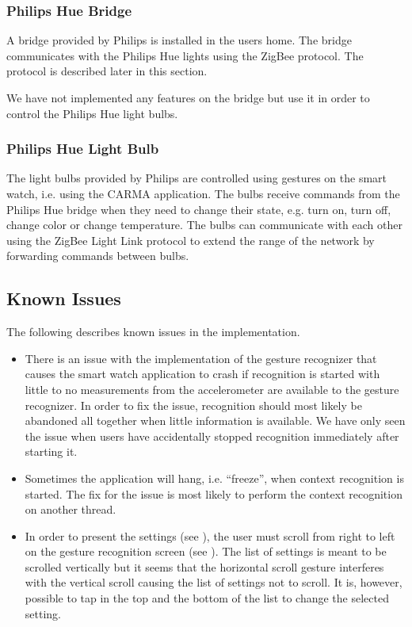 \subsubsection{Philips Hue Bridge}

A bridge provided by Philips is installed in the users home. The bridge communicates with the Philips Hue lights using the ZigBee protocol. The protocol is described later in this section.

We have not implemented any features on the bridge but use it in order to control the Philips Hue light bulbs.

\subsubsection{Philips Hue Light Bulb}

The light bulbs provided by Philips are controlled using gestures on the smart watch, i.e. using the CARMA application. The bulbs receive commands from the Philips Hue bridge when they need to change their state, e.g. turn on, turn off, change color or change temperature. The bulbs can communicate with each other using the ZigBee Light Link protocol to extend the range of the network by forwarding commands between bulbs.

\subsection{Known Issues}

The following describes known issues in the implementation.

\begin{itemize}
\item There is an issue with the implementation of the gesture recognizer that causes the smart watch application to crash if recognition is started with little to no measurements from the accelerometer are available to the gesture recognizer. In order to fix the issue, recognition should most likely be abandoned all together when little information is available. We have only seen the issue when users have accidentally stopped recognition immediately after starting it.
\item Sometimes the application will hang, i.e. ``freeze'', when context recognition is started. The fix for the issue is most likely to perform the context recognition on another thread.
\item In order to present the settings (see ), the user must scroll from right to left on the gesture recognition screen (see ). The list of settings is meant to be scrolled vertically but it seems that the horizontal scroll gesture interferes with the vertical scroll causing the list of settings not to scroll. It is, however, possible to tap in the top and the bottom of the list to change the selected setting.
\end{itemize}


